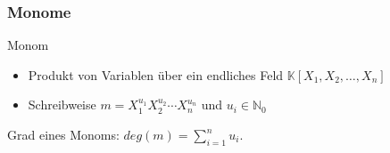 \documentclass{beamer}
\begin{document}
\begin{frame}[fragile]
\frametitle{Monome }

\begin{block}{Monom}
\begin{itemize}
\item Produkt von Variablen über ein endliches Feld $ \mathbb{K} \left[X_{1},X_{2},\dots, X_{n}\right]  $ 
\item Schreibweise $m= X_{1}^{u_{1}}X_{2}^{u_{2}}\cdots X_{n}^{u_{n}}$ und $u_i \in \mathbb{N}_{0}  $
\end{itemize}

\end{block}

Grad eines Monoms:  $deg(m) = \sum_{i=1}^n u_i $. 




\end{frame}
\end{document}
